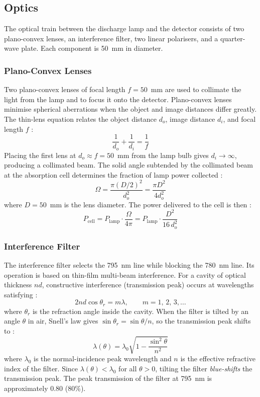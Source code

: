 \subsection{Optics}

The optical train between the discharge lamp and the detector consists of two
plano-convex lenses, an interference filter, two linear polarisers, and a quarter-wave
plate. Each component is 50~mm in diameter.

\subsubsection*{Plano-Convex Lenses}

Two plano-convex lenses of focal length $f = 50$~mm are used to collimate the light
from the lamp and to focus it onto the detector. Plano-convex lenses minimise spherical
aberrations when the object and image distances differ greatly. The thin-lens equation
relates the object distance $d_o$, image distance $d_i$, and focal length $f$ :
\begin{equation}
    \frac{1}{d_o} + \frac{1}{d_i} = \frac{1}{f}
\end{equation}
Placing the first lens at $d_o \approx f = 50$~mm from the lamp bulb gives
$d_i \to \infty$, producing a collimated beam. The solid angle subtended by the
collimated beam at the absorption cell determines the fraction of lamp power collected :
\begin{equation}
    \Omega = \frac{\pi (D/2)^2}{d_o^2} = \frac{\pi D^2}{4d_o^2}
\end{equation}
where $D = 50$~mm is the lens diameter. The power delivered to the cell is then :
\begin{equation}
    P_{\text{cell}} = P_{\text{lamp}} \cdot \frac{\Omega}{4\pi}
                    = P_{\text{lamp}} \cdot \frac{D^2}{16\,d_o^2}
\end{equation}

\subsubsection*{Interference Filter}

The interference filter selects the 795~nm line while blocking the 780~nm line.
Its operation is based on thin-film multi-beam interference. For a cavity of optical
thickness $nd$, constructive interference (transmission peak) occurs at wavelengths
satisfying :
\begin{equation}
    2nd\cos\theta_r = m\lambda, \qquad m = 1,\,2,\,3,\ldots
\end{equation}
where $\theta_r$ is the refraction angle inside the cavity. When the filter is tilted by
an angle $\theta$ in air, Snell's law gives $\sin\theta_r = \sin\theta/n$, so the
transmission peak shifts to :
\begin{equation}
    \lambda(\theta) = \lambda_0\sqrt{1 - \frac{\sin^2\theta}{n^2}}
\end{equation}
where $\lambda_0$ is the normal-incidence peak wavelength and $n$ is the effective
refractive index of the filter. Since $\lambda(\theta) < \lambda_0$ for all $\theta > 0$,
tilting the filter \emph{blue-shifts} the transmission peak. The peak transmission of
the filter at 795~nm is approximately 0.80 (80\%).

